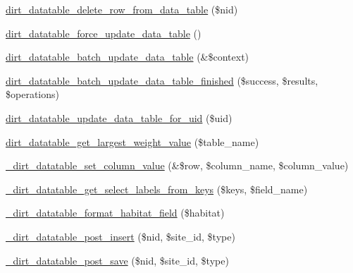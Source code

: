 \begin{DoxyCompactItemize}
\item 
\mbox{\hyperlink{dirt__datatable_8search__table__db__ops_8inc_a236d3a37a219ea8ee437c3e95b71fa63}{dirt\+\_\+datatable\+\_\+delete\+\_\+row\+\_\+from\+\_\+data\+\_\+table}} (\$nid)
\item 
\mbox{\hyperlink{dirt__datatable_8search__table__db__ops_8inc_a7e0768a827324cfb884e9825e072bc80}{dirt\+\_\+datatable\+\_\+force\+\_\+update\+\_\+data\+\_\+table}} ()
\item 
\mbox{\hyperlink{dirt__datatable_8search__table__db__ops_8inc_aa479ea4c24b2d2ed194045dffd2b8f67}{dirt\+\_\+datatable\+\_\+batch\+\_\+update\+\_\+data\+\_\+table}} (\&\$context)
\item 
\mbox{\hyperlink{dirt__datatable_8search__table__db__ops_8inc_afb2c810c564c18162fd3ec447d75bdf2}{dirt\+\_\+datatable\+\_\+batch\+\_\+update\+\_\+data\+\_\+table\+\_\+finished}} (\$success, \$results, \$operations)
\item 
\mbox{\hyperlink{dirt__datatable_8search__table__db__ops_8inc_a22267f033abe6aefeb6b4d152407ca3e}{dirt\+\_\+datatable\+\_\+update\+\_\+data\+\_\+table\+\_\+for\+\_\+uid}} (\$uid)
\item 
\mbox{\hyperlink{dirt__datatable_8search__table__db__ops_8inc_a8b5bf49aad44372c82d68d3fc549892a}{dirt\+\_\+datatable\+\_\+get\+\_\+largest\+\_\+weight\+\_\+value}} (\$table\+\_\+name)
\item 
\mbox{\hyperlink{dirt__datatable_8search__table__db__ops_8inc_a12a9763ac4b71416e9535621490b6bbc}{\+\_\+dirt\+\_\+datatable\+\_\+set\+\_\+column\+\_\+value}} (\&\$row, \$column\+\_\+name, \$column\+\_\+value)
\item 
\mbox{\hyperlink{dirt__datatable_8search__table__db__ops_8inc_a852415cf4e069878e396068261db822e}{\+\_\+dirt\+\_\+datatable\+\_\+get\+\_\+select\+\_\+labels\+\_\+from\+\_\+keys}} (\$keys, \$field\+\_\+name)
\item 
\mbox{\hyperlink{dirt__datatable_8search__table__db__ops_8inc_a4ed8004667d84d1f6b4089ccf5a9b75a}{\+\_\+dirt\+\_\+datatable\+\_\+format\+\_\+habitat\+\_\+field}} (\$habitat)
\item 
\mbox{\hyperlink{dirt__datatable_8search__table__db__ops_8inc_adec9143c53d2375133e53a0864ed2e9b}{\+\_\+dirt\+\_\+datatable\+\_\+post\+\_\+insert}} (\$nid, \$site\+\_\+id, \$type)
\item 
\mbox{\hyperlink{dirt__datatable_8search__table__db__ops_8inc_aa326c55a12bf69c9f42faeec846697b2}{\+\_\+dirt\+\_\+datatable\+\_\+post\+\_\+save}} (\$nid, \$site\+\_\+id, \$type)
\item 

\end{DoxyCompactItemize}
